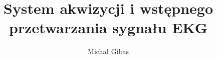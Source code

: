 \documentclass[inzynier,druk]{dyplom}
\author{Michał Gibas}
\title{System akwizycji i wstępnego przetwarzania sygnału EKG}
\begin{document}
\maketitle



\tableofcontents



















\nocite{*}




\listoffigures
\listoflistings
\listoftables

\appendixpage
\appendix

\end{document}
